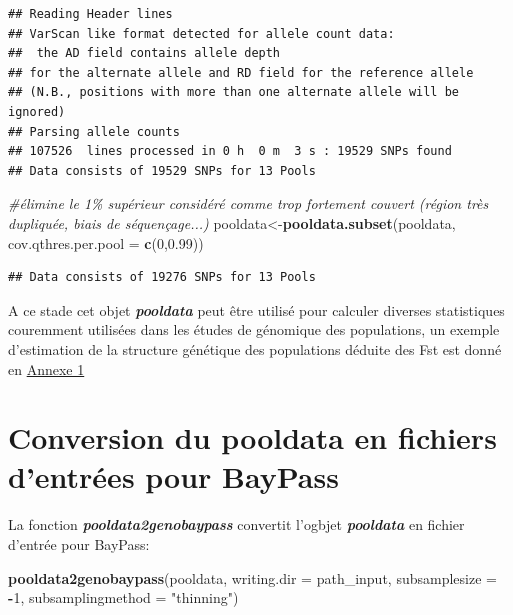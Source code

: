 \documentclass[
  openany]{book}
\newenvironment{Shaded}{\begin{snugshade}}{\end{snugshade}}
\newcommand{\AttributeTok}[1]{\textcolor[rgb]{0.13,0.29,0.53}{#1}}
\newcommand{\CommentTok}[1]{\textcolor[rgb]{0.56,0.35,0.01}{\textit{#1}}}
\newcommand{\DecValTok}[1]{\textcolor[rgb]{0.00,0.00,0.81}{#1}}
\newcommand{\FloatTok}[1]{\textcolor[rgb]{0.00,0.00,0.81}{#1}}
\newcommand{\FunctionTok}[1]{\textcolor[rgb]{0.13,0.29,0.53}{\textbf{#1}}}
\newcommand{\NormalTok}[1]{#1}
\newcommand{\OtherTok}[1]{\textcolor[rgb]{0.56,0.35,0.01}{#1}}
\newcommand{\SpecialCharTok}[1]{\textcolor[rgb]{0.81,0.36,0.00}{\textbf{#1}}}
\newcommand{\StringTok}[1]{\textcolor[rgb]{0.31,0.60,0.02}{#1}}
\theoremstyle{definition}
\theoremstyle{definition}
\theoremstyle{definition}
\theoremstyle{definition}
\theoremstyle{remark}
\begin{document}
\begin{verbatim}
## Reading Header lines
## VarScan like format detected for allele count data:
##  the AD field contains allele depth
## for the alternate allele and RD field for the reference allele
## (N.B., positions with more than one alternate allele will be ignored)
## Parsing allele counts
## 107526  lines processed in 0 h  0 m  3 s : 19529 SNPs found
## Data consists of 19529 SNPs for 13 Pools
\end{verbatim}

\begin{Shaded}
\begin{Highlighting}[]
\CommentTok{\#élimine le 1\% supérieur considéré comme trop fortement couvert (région très dupliquée, biais de séquençage...)}
\NormalTok{pooldata}\OtherTok{\textless{}{-}}\FunctionTok{pooldata.subset}\NormalTok{(pooldata, }\AttributeTok{cov.qthres.per.pool =} \FunctionTok{c}\NormalTok{(}\DecValTok{0}\NormalTok{,}\FloatTok{0.99}\NormalTok{))}
\end{Highlighting}
\end{Shaded}

\begin{verbatim}
## Data consists of 19276 SNPs for 13 Pools
\end{verbatim}

A ce stade cet objet \textbf{\emph{pooldata}} peut être utilisé pour calculer diverses statistiques couremment utilisées dans les études de génomique des populations, un exemple d'estimation de la structure génétique des populations déduite des Fst est donné en \protect\hyperlink{An1}{Annexe 1}

\hypertarget{conversion-du-pooldata-en-fichiers-dentruxe9es-pour-baypass}{%
\chapter*{Conversion du pooldata en fichiers d'entrées pour BayPass}\label{conversion-du-pooldata-en-fichiers-dentruxe9es-pour-baypass}}

La fonction \textbf{\emph{pooldata2genobaypass}} convertit l'ogbjet \textbf{\emph{pooldata}} en fichier d'entrée pour BayPass:

\begin{Shaded}
\begin{Highlighting}[]
\FunctionTok{pooldata2genobaypass}\NormalTok{(pooldata, }\AttributeTok{writing.dir =}\NormalTok{ path\_input, }\AttributeTok{subsamplesize =} \SpecialCharTok{{-}}\DecValTok{1}\NormalTok{, }\AttributeTok{subsamplingmethod =} \StringTok{"thinning"}\NormalTok{)}
\end{Highlighting}
\end{Shaded}
\end{document}

